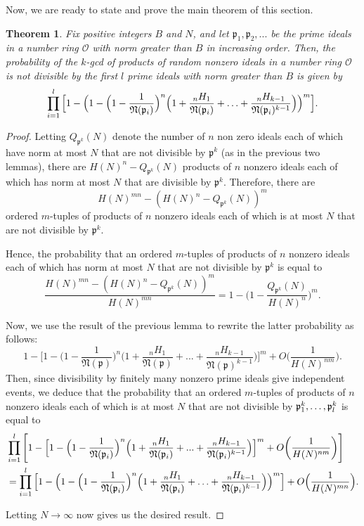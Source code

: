 \documentclass[12pt]{amsart}
\newtheorem{theorem}{Theorem}[subsection]
\theoremstyle{definition}
\newcommand{\f}[1]{\mathfrak{#1}}
\begin{document}
Now, we are ready to state and prove the main theorem of this section.

\begin{theorem}
	Fix positive integers $B$ and $N$, and let $\f{p}_1, \f{p}_2, ...$ be the prime ideals in a number ring $\mathcal{O}$ with norm greater than $B$ in increasing order. Then, the probability of the $k$-gcd of products of random nonzero ideals in a number ring $\mathcal{O}$ is not divisible by the first $l$ prime ideals with norm greater than $B$ is given by 
	$$\prod_{i=1}^{l} \Big[1 - \Big(1 - \Big(1-\frac{1}{\mathfrak{N}(\f{p}_i)}\Big)^n \Big(1+\frac{{}_nH_1}{\f{N}(\f{p}_i)}+\mathellipsis+\frac{{}_nH_{k-1}}{\f{N}(\f{p}_i)^{k-1}}\Big)\Big)^m\Big].$$
\end{theorem}

\begin{proof}
	Letting $Q_{\f{p}^k}(N)$ denote the number of $n$ non zero ideals each of which have norm at most $N$ that are not divisible by $\f{p}^k$ (as in the previous two lemmas), there are $H(N)^n - Q_{\f{p}^k}(N)$ products of $n$ nonzero ideals each of which has norm at most $N$ that are divisible by $\f{p}^k$. Therefore, there are 
	$$H(N)^{mn} - (H(N)^n - Q_{\f{p}^k}(N))^m$$
	ordered $m$-tuples of products of $n$ nonzero ideals each of which is at most $N$ that are not divisible by $\f{p}^k$.
	
	Hence, the probability that an ordered $m$-tuples of products of $n$ nonzero ideals each of which has norm at most $N$ that are not divisible by $\f{p}^k$ is equal to
	$$\frac{H(N)^{mn} - (H(N)^n - Q_{\f{p}^k}(N))^m}{H(N)^{mn}} = 1 - \Big(1 - \frac{Q_{\f{p}^k}(N)}{H(N)^n}\Big)^m.$$
	
	Now, we use the result of the previous lemma to rewrite the latter probability as follows:
	$$1 - \Big[1 - \Big(1 - \frac{1}{\f{N}(\f{p})}\Big)^n \Big(1 + \frac{{}_nH_1}{\f{N}(\f{p})} + ... + \frac{{}_nH_{k-1}}{\f{N}(\f{p})^{k-1}}\Big)\Big]^m+O\bigg(\frac{1}{H(N)^{nm}}\bigg).$$
	Then, since divisibility by finitely many nonzero prime ideals give independent events, we deduce that the probability that an ordered $m$-tuples of products of $n$ nonzero ideals each of which is at most $N$ that are not divisible by $\f{p}_1^k,\mathellipsis,\f{p}_l^k$ is equal to
	\begin{align*} &\prod_{i=1}^l \Bigg[1 - \Big[1 - \Big(1 - \frac{1}{\f{N}(\f{p}_i)}\Big)^n \Big(1 + \frac{{}_nH_1}{\f{N}(\f{p}_i)} + ... + \frac{{}_nH_{k-1}}{\f{N}(\f{p}_i)^{k-1}}\Big)\Big]^m + O\bigg(\frac{1}{H(N)^{nm}}\bigg) \Bigg]\\
		&=\prod_{i=1}^l \Big[1 - \Big(1 -\Big(1-\frac{1}{\f{N}(\f{p}_i)}\Big)^n\Big(1+\frac{{}_nH_1}{\f{N}(\f{p}_i)}+\mathellipsis+\frac{{}_nH_{k-1}}{\f{N}(\f{p}_i)^{k-1}}\Big)\Big)^m\Big] + O\Big(\frac{1}{H(N)^{mn}}\Big). \end{align*}
	
	\noindent Letting $N \to \infty$ now gives us the desired result.
\end{proof}
\end{document}
